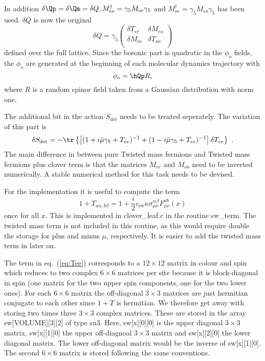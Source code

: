 In addition $\delta\Qp = \delta\Qm = \delta Q, M_{eo}^\dagger =
\gamma_5 M_{oe}\gamma_5$ and $M_{oe}^\dagger = \gamma_5
M_{eo}\gamma_5$ has been used.  $\delta Q$
is now the original
\[
\delta Q = \gamma_5
\begin{pmatrix}
  \delta T_{ee} & \delta M_{eo} \\
  \delta M_{oe} & \delta T_{oo} \\
\end{pmatrix}
\]
defined over the full lattice. Since the bosonic part
is quadratic in the $\phi_o$ fields, the $\phi_o$ are generated at the
beginning of each molecular dynamics trajectory with
\begin{equation}
  \label{eq:eosw10}
  \phi_o = \hQp R,
\end{equation}
where $R$ is a random spinor field taken from a Gaussian distribution
with norm one.

The additional bit in the action $S_{\det}$ needs to be treated
seperately. The variation of this part is
\begin{equation}
  \label{eq:eosw11}
  \delta S_{\det} = -\tr \left\{ \left[(1+i\tilde\mu\gamma_5 + T_{ee})^{-1}  +
    (1-i\tilde\mu\gamma_5 + T_{ee})^{-1}\right] \delta T_{ee} \right\} \ . 
\end{equation}
The main difference in between pure Twisted mass fermions and Twisted
mass fermions plus clover term is that the matrices $M_{ee}$ and
$M_{oo}$ need to be inverted numerically. A stable numerical method
for this task needs to be devised.

For the implementation it is useful to compute the term
\begin{equation}
  \label{eq:Tee}
  1+T_{a\alpha,b\beta} = 1 + \frac{i}{2} c_\mathrm{sw}
  \kappa\sigma_{\mu\nu}^{\alpha\beta}F_{\mu\nu}^{ab}(x)
\end{equation}  
once for all $x$. This is implemented in {\ttfamily clover\_leaf.c} in
the routine {\ttfamily sw\_term}. The twisted mass term is not
included in this routine, as this would require double the storage for
plus and minus $\mu$, respectively. It is easier to add the twisted
mass term in later on. 

The term in eq.~(\ref{eq:Tee}) corresponds to a $12\times12$ matrix
in colour and spin which reduces to two complex $6\times6$ matrices
per site because it is block-diagonal in spin (one matrix for the two
upper spin components, one for the two lower ones). 
For each $6\times6$ matrix the off-diagonal $3\times3$
matrices are just hermitian conjugate to each other since $1+T$ is hermitian.
We therefore get away with storing two times three 
$3\times3$ complex matrices. These are stored in the array {\ttfamily
  sw[VOLUME][3][2]} of type {\ttfamily su3}. Here, {\ttfamily
  sw[x][0][0]} is the upper diagonal $3\times3$ matrix, {\ttfamily
  sw[x][1][0]} the upper off-diagnoal $3\times3$ matrix and {\ttfamily
  sw[x][2][0]} the lower diagonal matrix. The lower off-diagonal
matrix would be the inverse of {\ttfamily sw[x][1][0]}. The second
$6\times6$ matrix is stored following the same conventions.

